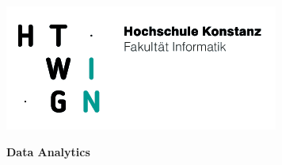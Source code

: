 \noindent
\begin{minipage}[t]{0.4\textwidth} 
\includegraphics[width=\linewidth]{htwg_logo.png}
\end{minipage}%
\hfill%
\begin{minipage}[t]{0.6\textwidth}\raggedleft
\textbf{\large Data Analytics}
\end{minipage}


